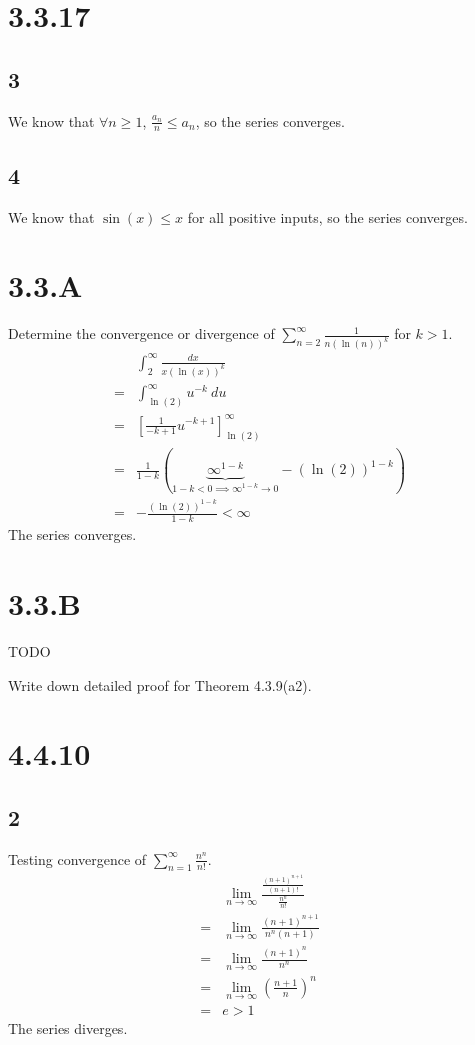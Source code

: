 \documentclass[12pt]{article}
\newcommand{\round}[1]{\left(       #1 \right)      }
\newcommand{\hard} [1]{\left[       #1 \right]      }
\begin{document}
\section*{3.3.17}

\subsection*{3}
We know that $\forall n \geq 1$, $\frac{a_n}{n} \leq a_n$, so the series converges.

\subsection*{4}
We know that $\sin(x) \leq x$ for all positive inputs, so the series converges.



\section*{3.3.A}
Determine the convergence or divergence of $\sum_{n=2}^\infty \frac{1}{n(\ln(n))^{k}}$ for $k>1$.
\begin{align*}
     & \int_{2}^\infty \frac{dx}{x (\ln(x))^k} \\
    =& \int_{\ln(2)}^\infty u^{-k}\ du \\
    =& \hard{\frac{1}{-k+1} u^{-k+1}}_{\ln(2)}^\infty \\
    =& \frac{1}{1-k} \round{\underbrace{\infty^{1-k}}_{1-k<0 \implies \infty^{1-k} \to 0} - (\ln(2))^{1-k}} \\
    =& -\frac{(\ln(2))^{1-k}}{1-k} < \infty
\end{align*}
The series converges.



\section*{3.3.B}
TODO

Write down detailed proof for Theorem 4.3.9(a2).



\section*{4.4.10}

\subsection*{2}
Testing convergence of $\sum_{n=1}^\infty \frac{n^n}{n!}$.
\begin{align*}
     & \lim_{n\to\infty} \frac{\frac{(n+1)^{n+1}}{(n+1)!}}{\frac{n^n}{n!}} \\
    =& \lim_{n\to\infty} \frac{(n+1)^{n+1}}{n^n (n+1)} \\
    =& \lim_{n\to\infty} \frac{(n+1)^n}{n^n} \\
    =& \lim_{n\to\infty} \round{\frac{n+1}{n}}^n \\
    =& e > 1
\end{align*}
The series diverges.
\end{document}
